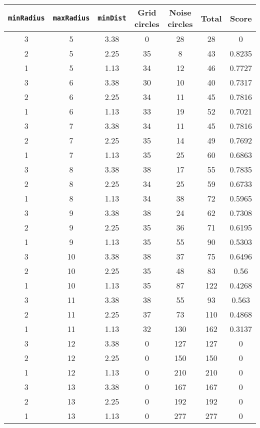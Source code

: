 \documentclass[letterpaper, 12pt]{article}
\begin{document}
\begin{longtable}{|c|c|c|c|c|c|c|}
\hline
\textbf{\texttt{minRadius}} & \textbf{\texttt{maxRadius}} & \textbf{\texttt{minDist}} & \textbf{Grid circles} & \textbf{Noise circles} & \textbf{Total} & \textbf{Score} \\
\hline
3 & 5 & 3.38 & 0 & 28 & 28 & 0 \\
\hline
2 & 5 & 2.25 & 35 & 8 & 43 & 0.8235 \\
\hline
1 & 5 & 1.13 & 34 & 12 & 46 & 0.7727 \\
\hline
3 & 6 & 3.38 & 30 & 10 & 40 & 0.7317 \\
\hline
2 & 6 & 2.25 & 34 & 11 & 45 & 0.7816 \\
\hline
1 & 6 & 1.13 & 33 & 19 & 52 & 0.7021 \\
\hline
3 & 7 & 3.38 & 34 & 11 & 45 & 0.7816 \\
\hline
2 & 7 & 2.25 & 35 & 14 & 49 & 0.7692 \\
\hline
1 & 7 & 1.13 & 35 & 25 & 60 & 0.6863 \\
\hline
3 & 8 & 3.38 & 38 & 17 & 55 & 0.7835 \\
\hline
2 & 8 & 2.25 & 34 & 25 & 59 & 0.6733 \\
\hline
1 & 8 & 1.13 & 34 & 38 & 72 & 0.5965 \\
\hline
3 & 9 & 3.38 & 38 & 24 & 62 & 0.7308 \\
\hline
2 & 9 & 2.25 & 35 & 36 & 71 & 0.6195 \\
\hline
1 & 9 & 1.13 & 35 & 55 & 90 & 0.5303 \\
\hline
3 & 10 & 3.38 & 38 & 37 & 75 & 0.6496 \\
\hline
2 & 10 & 2.25 & 35 & 48 & 83 & 0.56 \\
\hline
1 & 10 & 1.13 & 35 & 87 & 122 & 0.4268 \\
\hline
3 & 11 & 3.38 & 38 & 55 & 93 & 0.563 \\
\hline
2 & 11 & 2.25 & 37 & 73 & 110 & 0.4868 \\
\hline
1 & 11 & 1.13 & 32 & 130 & 162 & 0.3137 \\
\hline
3 & 12 & 3.38 & 0 & 127 & 127 & 0 \\
\hline
2 & 12 & 2.25 & 0 & 150 & 150 & 0 \\
\hline
1 & 12 & 1.13 & 0 & 210 & 210 & 0 \\
\hline
3 & 13 & 3.38 & 0 & 167 & 167 & 0 \\
\hline
2 & 13 & 2.25 & 0 & 192 & 192 & 0 \\
\hline
1 & 13 & 1.13 & 0 & 277 & 277 & 0 \\

\end{longtable}
\end{document}

